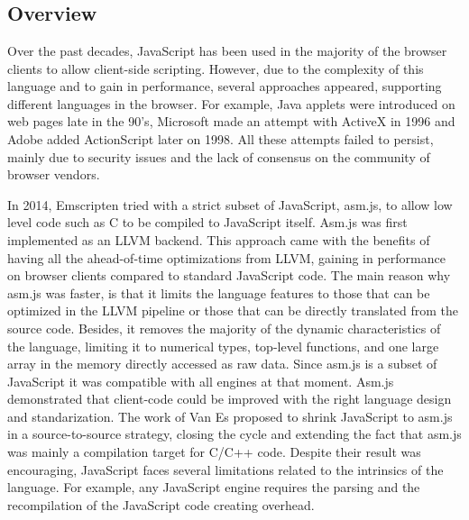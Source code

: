 \section{\wasm}
\label{sota:wasm}

\newcommand{\lineref}[1]{Line \autoref{#1}}


\subsection*{Overview}

Over the past decades, JavaScript has been used in the majority of the browser clients to allow client-side scripting. However, due to the complexity of this language and to gain in performance, several approaches appeared, supporting different languages in the browser.  For example, Java applets were introduced on web pages late in the 90's, Microsoft made an attempt with ActiveX in 1996  and Adobe added ActionScript later on 1998. All these attempts failed to persist, mainly due to security issues and the lack of consensus on the community of browser vendors. 

In 2014, Emscripten tried with a strict subset of JavaScript, asm.js, to allow low level code such as C to be compiled to JavaScript itself. Asm.js was first implemented as an LLVM backend. This approach came with the benefits of having all the ahead-of-time optimizations from LLVM, gaining in performance on browser clients \cite{asmjs} compared to standard JavaScript code. The main reason why asm.js was faster, is that it limits the language features to those that can be optimized in the LLVM pipeline or those that can be directly translated from the source code. Besides, it removes the majority of the dynamic characteristics of the language, limiting it to numerical types, top-level functions, and one large array in the memory directly accessed as raw data. Since asm.js is a subset of JavaScript it was compatible with all engines at that moment. Asm.js demonstrated that client-code could be improved with the right language design and standarization.
The work of Van Es \etal \cite{EsAsm.js} proposed to shrink JavaScript to asm.js in a source-to-source strategy, closing the cycle and extending the fact that asm.js was mainly a compilation target for C/C++ code. Despite their result was encouraging, JavaScript faces several limitations related to the intrinsics of the language. For example, any JavaScript engine requires the parsing and the recompilation of the JavaScript code creating overhead.

